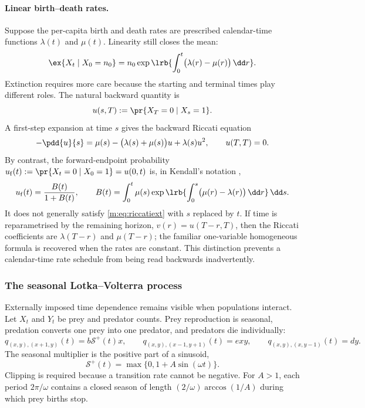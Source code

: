 \paragraph{Linear birth--death rates.}
\label{m:sec:tibd}
Suppose the per-capita birth and death rates are prescribed calendar-time
functions $\lambda(t)$ and $\mu(t)$. Linearity still closes the mean:
\begin{equation}
\label{m:eq:meanodeinhom}
\ex{X_t\mid X_0=n_0}
=n_0\exp\lrb{\int_0^t\bigl(\lambda(r)-\mu(r)\bigr)\,\dd r}.
\end{equation}
Extinction requires more care because the starting and terminal times play
different roles. The natural backward quantity is
\[
u(s,T):=\pr{X_T=0\mid X_s=1}.
\]
A first-step expansion at time $s$ gives the backward Riccati equation
\begin{equation}
\label{m:eq:riccatiext}
-\pdd{u}{s}
=\mu(s)-\bigl(\lambda(s)+\mu(s)\bigr)u+\lambda(s)u^2,
\qquad
u(T,T)=0.
\end{equation}
By contrast, the forward-endpoint probability
$u_{\mathrm f}(t):=\pr{X_t=0\mid X_0=1}=u(0,t)$ is, in Kendall's notation
\cite{Kendall1948},
\begin{equation}
\label{m:eq:inhomextforward}
u_{\mathrm f}(t)=\frac{B(t)}{1+B(t)},
\qquad
B(t)=\int_0^t\mu(s)
\exp\lrb{\int_0^s\bigl(\mu(r)-\lambda(r)\bigr)\,\dd r}\,\dd s.
\end{equation}
It does not generally satisfy \cref{m:eq:riccatiext} with $s$ replaced by
$t$. If time is reparametrised by the remaining horizon,
$v(r)=u(T-r,T)$, then the Riccati coefficients are
$\lambda(T-r)$ and $\mu(T-r)$; the familiar one-variable homogeneous formula
is recovered when the rates are constant. This distinction prevents a
calendar-time rate schedule from being read backwards inadvertently.

\subsubsection{The seasonal Lotka--Volterra process}
\label{m:sec:seasonallv}

Externally imposed time dependence remains visible when populations interact.
Let $X_t$ and $Y_t$ be prey and predator counts. Prey reproduction is seasonal,
predation converts one prey into one predator, and predators die individually:
\begin{equation}
\label{m:eq:lvrate}
q_{(x,y),(x+1,y)}(t)=b\mathcal S^+(t)x,
\qquad
q_{(x,y),(x-1,y+1)}(t)=exy,
\qquad
q_{(x,y),(x,y-1)}(t)=dy.
\end{equation}
The seasonal multiplier is the positive part of a sinusoid,
\begin{equation}
\label{m:eq:lvkernel}
\mathcal S^+(t)=\max\{0,1+A\sin(\omega t)\}.
\end{equation}
Clipping is required because a transition rate cannot be negative. For $A>1$,
each period $2\pi/\omega$ contains a closed season of length
$(2/\omega)\arccos(1/A)$ during which prey births stop.

